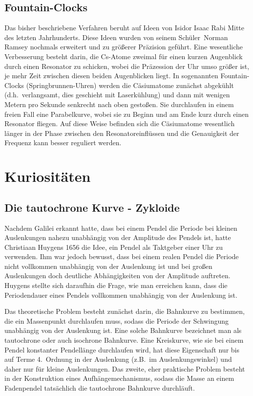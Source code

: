 \subsection{Fountain-Clocks}

Das bisher beschriebene Verfahren beruht auf Ideen von Isidor Isaac Rabi Mitte des letzten Jahrhunderts.
Diese Ideen wurden von seinem \glqq Sch\"uler\grqq\ Norman Ramsey nochmals erweitert und zu gr\"o\ss erer
Pr\"azision gef\"uhrt. Eine wesentliche Verbesserung besteht darin, die Cs-Atome zweimal f\"ur einen
kurzen Augenblick durch einen Resonator zu schicken, wobei die Pr\"azession der Uhr umso gr\"o\ss er ist, je
mehr Zeit zwischen diesen beiden Augenblicken liegt. 
In sogenannten Fountain-Clocks (\glqq Springbrunnen-Uhren\grqq)
werden die C\"asiumatome zun\"achst abgek\"uhlt (d.h.\ verlangsamt, dies geschieht mit Laserk\"uhlung) 
und dann mit wenigen Metern pro
Sekunde senkrecht nach oben gesto\ss en. Sie durchlaufen in einem freien Fall eine Parabelkurve, wobei
sie zu Beginn und am Ende kurz durch einen Resonator fliegen. Auf diese Weise befinden sich die C\"asiumatome 
wesentlich l\"anger in der Phase zwischen den Resonatoreinfl\"ussen und die Genauigkeit der Frequenz 
kann besser reguliert werden. 

\section{Kuriosit\"aten}

\subsection{Die tautochrone Kurve - Zykloide}

Nachdem Galilei erkannt hatte, dass bei einem Pendel die Periode bei kleinen Auslenkungen
nahezu unabh\"angig von der Amplitude des Pendels ist, hatte 
Christiaan Huygens 
1656 die Idee, ein Pendel als Taktgeber einer Uhr zu verwenden. Ihm war jedoch
bewusst, dass bei einem realen Pendel die Periode nicht vollkommen unabh\"angig von der Auslenkung
ist und bei gro\ss en Auslenkungen doch deutliche Abh\"angigkeiten von der Amplitude auftreten.
Huygens stellte sich daraufhin die Frage, wie man erreichen kann, dass die Periodendauer eines
Pendels vollkommen unabh\"angig von der Auslenkung ist. 

Das theoretische Problem besteht zun\"achst darin, die Bahnkurve zu bestimmen, die ein
Massenpunkt durchlaufen muss, sodass die Periode der Schwingung unabh\"angig von der Auslenkung ist.
Eine solche Bahnkurve bezeichnet man als 
tautochrone oder auch isochrone Bahnkurve.
Eine Kreiskurve, wie sie bei einem Pendel konstanter Pendell\"ange durchlaufen wird, hat diese 
Eigenschaft nur bis auf Terme 4.\ Ordnung in der Auslenkung (z.B.\ im Auslenkungswinkel) und daher
nur f\"ur kleine Auslenkungen. Das
zweite, eher praktische Problem besteht in der Konstruktion eines Aufh\"angemechanismus,
sodass die Masse an einem Fadenpendel tats\"achlich die tautochrone Bahnkurve durchl\"auft.

